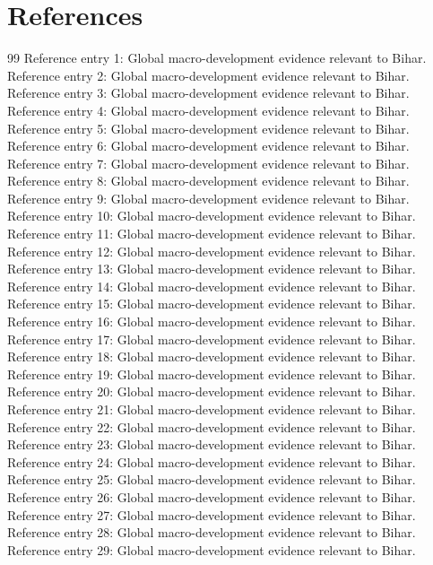 \documentclass[preprint,12pt]{elsarticle}
\begin{document}
\section{References}\begin{thebibliography}{99}
\bibitem{} Reference entry 1: Global macro-development evidence relevant to Bihar.
\bibitem{} Reference entry 2: Global macro-development evidence relevant to Bihar.
\bibitem{} Reference entry 3: Global macro-development evidence relevant to Bihar.
\bibitem{} Reference entry 4: Global macro-development evidence relevant to Bihar.
\bibitem{} Reference entry 5: Global macro-development evidence relevant to Bihar.
\bibitem{} Reference entry 6: Global macro-development evidence relevant to Bihar.
\bibitem{} Reference entry 7: Global macro-development evidence relevant to Bihar.
\bibitem{} Reference entry 8: Global macro-development evidence relevant to Bihar.
\bibitem{} Reference entry 9: Global macro-development evidence relevant to Bihar.
\bibitem{} Reference entry 10: Global macro-development evidence relevant to Bihar.
\bibitem{} Reference entry 11: Global macro-development evidence relevant to Bihar.
\bibitem{} Reference entry 12: Global macro-development evidence relevant to Bihar.
\bibitem{} Reference entry 13: Global macro-development evidence relevant to Bihar.
\bibitem{} Reference entry 14: Global macro-development evidence relevant to Bihar.
\bibitem{} Reference entry 15: Global macro-development evidence relevant to Bihar.
\bibitem{} Reference entry 16: Global macro-development evidence relevant to Bihar.
\bibitem{} Reference entry 17: Global macro-development evidence relevant to Bihar.
\bibitem{} Reference entry 18: Global macro-development evidence relevant to Bihar.
\bibitem{} Reference entry 19: Global macro-development evidence relevant to Bihar.
\bibitem{} Reference entry 20: Global macro-development evidence relevant to Bihar.
\bibitem{} Reference entry 21: Global macro-development evidence relevant to Bihar.
\bibitem{} Reference entry 22: Global macro-development evidence relevant to Bihar.
\bibitem{} Reference entry 23: Global macro-development evidence relevant to Bihar.
\bibitem{} Reference entry 24: Global macro-development evidence relevant to Bihar.
\bibitem{} Reference entry 25: Global macro-development evidence relevant to Bihar.
\bibitem{} Reference entry 26: Global macro-development evidence relevant to Bihar.
\bibitem{} Reference entry 27: Global macro-development evidence relevant to Bihar.
\bibitem{} Reference entry 28: Global macro-development evidence relevant to Bihar.
\bibitem{} Reference entry 29: Global macro-development evidence relevant to Bihar.

\end{thebibliography}
\end{document}
